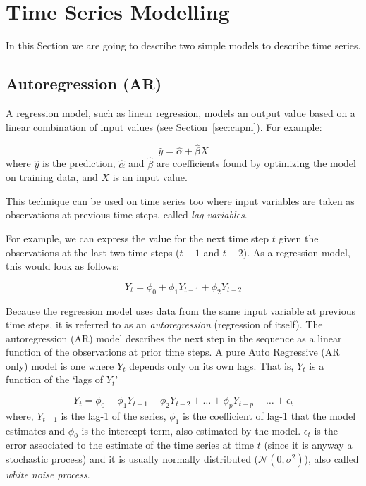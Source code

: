 \section{Time Series Modelling}\label{time-series-modelling}

In this Section we are going to describe two simple models to describe
time series.

\subsection{Autoregression (AR)}\label{autoregression-ar}

A regression model, such as linear regression, models an output value
based on a linear combination of input values (see Section~\ref{sec:capm}). For
example:

\begin{equation}
\hat{y} = \hat{\alpha} + \hat{\beta}X
\end{equation} 
where \(\hat{y}\) is the prediction, \(\hat{\alpha}\) and \(\hat{\beta}\) are coefficients found
by optimizing the model on training data, and \(X\) is an input value.

This technique can be used on time series too where input variables are
taken as observations at previous time steps, called
\emph{lag variables}.

For example, we can express the value for the next time step \(t\) given
the observations at the last two time steps (\(t-1\) and \(t-2\)). As a
regression model, this would look as follows:

\begin{equation}
Y_{t} = \phi_0 + \phi_1Y_{t-1} + \phi_2Y_{t-2}
\end{equation}

Because the regression model uses data from the same input variable at
previous time steps, it is referred to as an \emph{autoregression}
(regression of itself). The autoregression (AR) model describes the next
step in the sequence as a linear function of the observations at prior
time steps. A pure Auto Regressive (AR only) model is one where \(Y_t\)
depends only on its own lags. That is, \(Y_t\) is a function of the
`lags of \(Y_t\)'

\begin{equation}
Y_t = \phi_0 + \phi_1 Y_{t-1} + \phi_2 Y_{t-2} + \ldots + \phi_p Y_{t-p} + \ldots + \epsilon_t
\label{eq:ar}
\end{equation}
where, \(Y_{t-1}\) is the lag-1 of the series, \(\phi_1\) is the
coefficient of lag-1 that the model estimates and \(\phi_0\) is the
intercept term, also estimated by the model. \(\epsilon_t\) is the error
associated to the estimate of the time series at time \(t\) (since it 
is anyway a stochastic process) and it is
usually normally distributed (\(\mathcal{N}(0, \sigma^2)\)), also called
\emph{white noise process}.

